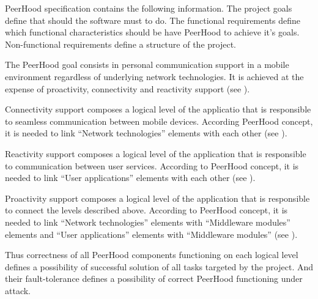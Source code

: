%
PeerHood specification contains the following information. 
%
The project goals define that should the software must to do. 
%
The functional requirements define which functional characteristics should be have PeerHood to achieve it's goals. 
%
Non-functional requirements define a structure of the project. 



%
The PeerHood goal consists in personal communication support in a mobile  environment regardless of underlying network technologies. 
%
It is achieved at the expense of proactivity, connectivity and reactivity support (see ). 

%
Connectivity support composes a logical level of the applicatio that is responsible to seamless communication between mobile devices. 
%
According PeerHood concept, it is needed to link ``Network technologies'' elements with each other (see ). 

%
Reactivity support composes a logical level of the application that is responsible to communication between user services. 
%
According to PeerHood concept, it is needed to link ``User applications'' elements with each other (see ). 

%
Proactivity support composes a logical level of the application that is responsible to connect the levels described above. 
%
According to PeerHood concept, it is needed to link ``Network technologies'' elements with ``Middleware modules'' elements and ``User applications'' elements with ``Middleware modules'' (see ). 

%
Thus correctness of all PeerHood components functioning on each logical level defines a possibility of successful solution of all tasks targeted by the project. 
%
And their fault-tolerance defines a possibility of correct PeerHood functioning under attack. 


